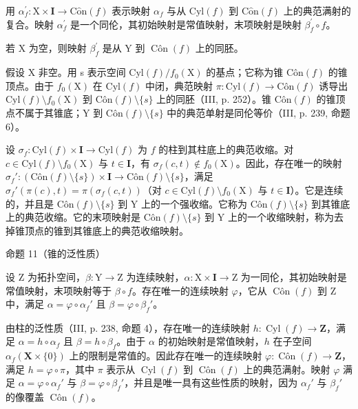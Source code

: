 用 \(\alpha_{f}^{\prime}\colon\mathrm{X}\times\mathbf{I}\to\mathrm{C}\hat{\mathrm{o}}\mathrm{n}(f)\) 表示映射 \(\alpha_{f}\) 与从 \(\mathrm{Cyl}(f)\) 到 \(\mathrm{C}\hat{\mathrm{o}}\mathrm{n}(f)\) 上的典范满射的复合。映射 \(\alpha_{f}^{\prime}\) 是一个同伦，其初始映射是常值映射，末项映射是映射 \(\beta_{f}^{\prime}\circ f\)。

若 X 为空，则映射 \(\beta_{f}^{\prime}\) 是从 Y 到 \(\operatorname{Côn}(f)\) 上的同胚。

假设 X 非空。用 s 表示空间 \(\mathrm{Cyl}(f)/f_{0}(\mathrm{X})\) 的基点；它称为锥 \(\mathrm{Côn}(f)\) 的锥顶点。由于 \(f_{0}(\mathrm{X})\) 在 \(\mathrm{Cyl}(f)\) 中闭，典范映射 \(\pi\colon\mathrm{Cyl}(f)\to\mathrm{Côn}(f)\) 诱导出 \(\mathrm{Cyl}(f)\setminus f_{0}(\mathrm{X})\) 到 \(\mathrm{Côn}(f)\setminus\{s\}\) 上的同胚（III, p. 252）。锥 \(\mathrm{Côn}(f)\) 的锥顶点不属于其锥底；Y 到 \(\mathrm{Côn}(f)\setminus\{s\}\) 中的典范单射是同伦等价（III, p. 239, 命题 6）。

设 \(\sigma_f\colon \mathrm{Cyl}(f)\times \mathbf{I}\to \mathrm{Cyl}(f)\) 为 \(f\) 的柱到其柱底上的典范收缩。对 \(c\in \mathrm{Cyl}(f)\setminus f_0(\mathrm{X})\) 与 \(t\in \mathbf{I}\)，有 \(\sigma_f(c,t)\notin f_0(\mathrm{X})\)。因此，存在唯一的映射 \(\sigma_f'\colon (\mathrm{Côn}(f)\setminus\{s\})\times \mathbf{I}\to \mathrm{Côn}(f)\setminus\{s\}\)，满足 \(\sigma_f'(\pi(c),t)=\pi(\sigma_f(c,t))\)（对 \(c\in \mathrm{Cyl}(f)\setminus f_0(\mathrm{X})\) 与 \(t\in \mathbf{I}\)）。它是连续的，并且是 \(\mathrm{Côn}(f)\setminus\{s\}\) 到 Y 上的一个强收缩。它称为 \(\mathrm{Côn}(f)\setminus\{s\}\) 到其锥底上的典范收缩。它的末项映射是 \(\mathrm{Côn}(f)\setminus\{s\}\) 到 Y 上的一个收缩映射，称为去掉锥顶点的锥到其锥底上的典范收缩映射。

命题 11（锥的泛性质）

设 Z 为拓扑空间，\(\beta: \mathrm{Y} \to \mathrm{Z}\) 为连续映射，\(\alpha: \mathrm{X} \times \mathbf{I} \to \mathrm{Z}\) 为一同伦，其初始映射是常值映射，末项映射等于 \(\beta \circ f\)。存在唯一的连续映射 \(\varphi\)，它从 \(\operatorname{Côn}(f)\) 到 Z 中，满足 \(\alpha = \varphi \circ \alpha_f'\) 且 \(\beta = \varphi \circ \beta_f'\)。

由柱的泛性质（III, p. 238, 命题 4），存在唯一的连续映射 \(h \colon \operatorname{Cyl}(f) \to \mathbf{Z}\)，满足 \(\alpha = h \circ \alpha_f\) 且 \(\beta = h \circ \beta_f\)。由于 \(\alpha\) 的初始映射是常值映射，\(h\) 在子空间 \(\alpha_f(\mathbf{X} \times \{0\})\) 上的限制是常值的。因此存在唯一的连续映射 \(\varphi \colon \operatorname{Côn}(f) \to \mathbf{Z}\)，满足 \(h = \varphi \circ \pi\)，其中 \(\pi\) 表示从 \(\operatorname{Cyl}(f)\) 到 \(\operatorname{Côn}(f)\) 上的典范满射。映射 \(\varphi\) 满足 \(\alpha = \varphi \circ \alpha_f'\) 与 \(\beta = \varphi \circ \beta_f'\)，并且是唯一具有这些性质的映射，因为 \(\alpha_f'\) 与 \(\beta_f'\) 的像覆盖 \(\operatorname{Côn}(f)\)。


